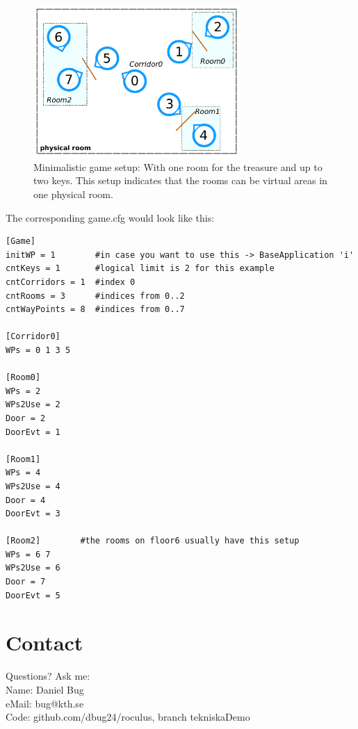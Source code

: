 \documentclass[a4paper, 12pt]{article}
\begin{document}
\begin{figure}[h!]
  \centering
  \includegraphics[width=0.7\textwidth]{./minigame.pdf}
  \caption{Minimalistic game setup: With one room for the treasure and up to two keys. This setup indicates that the rooms can be virtual areas in one physical room.}
  \label{fig:minigame}
\end{figure}

\bigskip
The corresponding game.cfg would look like this:
\begin{lstlisting}
[Game]
initWP = 1        #in case you want to use this -> BaseApplication 'i'
cntKeys = 1       #logical limit is 2 for this example
cntCorridors = 1  #index 0
cntRooms = 3      #indices from 0..2
cntWayPoints = 8  #indices from 0..7

[Corridor0]
WPs = 0 1 3 5

[Room0]
WPs = 2
WPs2Use = 2
Door = 2
DoorEvt = 1

[Room1]
WPs = 4
WPs2Use = 4
Door = 4
DoorEvt = 3

[Room2]        #the rooms on floor6 usually have this setup
WPs = 6 7
WPs2Use = 6
Door = 7
DoorEvt = 5
\end{lstlisting}

\section*{Contact}
Questions? Ask me:\\
Name: Daniel Bug\\
eMail: bug@kth.se\\

Code: github.com/dbug24/roculus, branch tekniskaDemo
\end{document}
